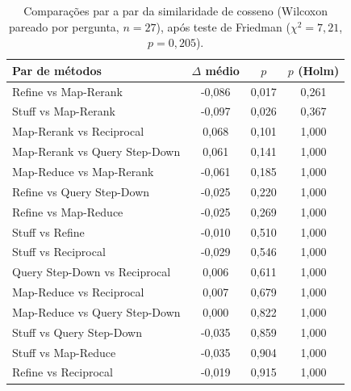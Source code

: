 \begin{table}[!t]
\centering
\footnotesize
\setlength{\tabcolsep}{4pt}
\caption{Comparações par a par da similaridade de cosseno (Wilcoxon pareado por pergunta, $n = 27$), após teste de Friedman ($\chi^2 = 7,21$, $p = 0,205$).}
\label{tab:posthoc_similaridade}
\begin{tabular}{lccc}
\toprule
Par de métodos & $\Delta$ médio & $p$ & $p$ (Holm) \\
\midrule
Refine vs Map-Rerank & -0,086 & 0,017 & 0,261 \\
Stuff vs Map-Rerank & -0,097 & 0,026 & 0,367 \\
Map-Rerank vs Reciprocal & 0,068 & 0,101 & 1,000 \\
Map-Rerank vs Query Step-Down & 0,061 & 0,141 & 1,000 \\
Map-Reduce vs Map-Rerank & -0,061 & 0,185 & 1,000 \\
Refine vs Query Step-Down & -0,025 & 0,220 & 1,000 \\
Refine vs Map-Reduce & -0,025 & 0,269 & 1,000 \\
Stuff vs Refine & -0,010 & 0,510 & 1,000 \\
Stuff vs Reciprocal & -0,029 & 0,546 & 1,000 \\
Query Step-Down vs Reciprocal & 0,006 & 0,611 & 1,000 \\
Map-Reduce vs Reciprocal & 0,007 & 0,679 & 1,000 \\
Map-Reduce vs Query Step-Down & 0,000 & 0,822 & 1,000 \\
Stuff vs Query Step-Down & -0,035 & 0,859 & 1,000 \\
Stuff vs Map-Reduce & -0,035 & 0,904 & 1,000 \\
Refine vs Reciprocal & -0,019 & 0,915 & 1,000 \\
\bottomrule
\end{tabular}
\end{table}
